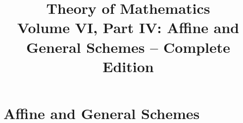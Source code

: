 \documentclass[11pt,a4paper,oneside,openany]{book}
\title{Theory of Mathematics\\[0.5em]\Large Volume VI, Part IV: Affine and General Schemes -- Complete Edition}
\author{}\date{}
\begin{document}
\maketitle\clearpage
\frontmatter\tableofcontents\mainmatter
\part{Affine and General Schemes}
\setcounter{chapter}{17}



\end{document}
